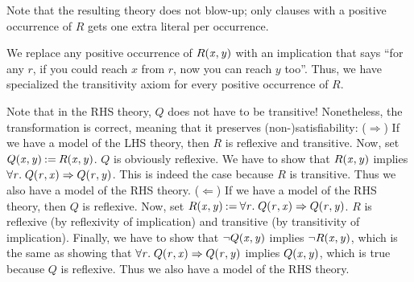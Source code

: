 \documentclass{article}
\newcommand{\Varid}[1]{\mathit{#1}}
\begin{document}
Note that the resulting theory does not blow-up; only clauses with a positive occurrence of \ensuremath{R} gets one extra literal per occurrence.

We replace any positive occurrence of \ensuremath{R\hspace{-0.1cm}\;(\Varid{x},\Varid{y})} with an implication that says ``for any \ensuremath{\Varid{r}}, if you could reach \ensuremath{\Varid{x}} from \ensuremath{\Varid{r}}, now you can reach \ensuremath{\Varid{y}} too''. Thus, we have specialized the transitivity axiom for every positive occurrence of \ensuremath{R}.

Note that in the RHS theory, \ensuremath{Q} does not have to be transitive! Nonetheless, the transformation is correct, meaning that it preserves (non-)satisfiability: ($\Rightarrow$) If we have a model of the LHS theory, then \ensuremath{R} is reflexive and transitive. Now, set \ensuremath{Q\hspace{-0.1cm}\;(\Varid{x},\Varid{y})\mathbin{:=}R\hspace{-0.1cm}\;(\Varid{x},\Varid{y})}. \ensuremath{Q} is obviously reflexive. We have to show that \ensuremath{R\hspace{-0.1cm}\;(\Varid{x},\Varid{y})} implies \ensuremath{\forall{}\hspace{-0.1cm}\;\Varid{r}.\;Q\hspace{-0.1cm}\;(\Varid{r},\Varid{x})\Rightarrow Q\hspace{-0.1cm}\;(\Varid{r},\Varid{y})}. This is indeed the case because \ensuremath{R} is transitive. Thus we also have a model of the RHS theory. ($\Leftarrow$) If we have a model of the RHS theory, then \ensuremath{Q} is reflexive. Now, set \ensuremath{R\hspace{-0.1cm}\;(\Varid{x},\Varid{y})\mathbin{:=}\forall{}\hspace{-0.1cm}\;\Varid{r}.\;Q\hspace{-0.1cm}\;(\Varid{r},\Varid{x})\Rightarrow Q\hspace{-0.1cm}\;(\Varid{r},\Varid{y})}. \ensuremath{R} is reflexive (by reflexivity of implication) and transitive (by transitivity of implication). Finally, we have to show that \ensuremath{\neg{}Q\hspace{-0.1cm}\;(\Varid{x},\Varid{y})} implies \ensuremath{\neg{}R\hspace{-0.1cm}\;(\Varid{x},\Varid{y})}, which is the same as showing that \ensuremath{\forall{}\hspace{-0.1cm}\;\Varid{r}.\;Q\hspace{-0.1cm}\;(\Varid{r},\Varid{x})\Rightarrow Q\hspace{-0.1cm}\;(\Varid{r},\Varid{y})} implies \ensuremath{Q\hspace{-0.1cm}\;(\Varid{x},\Varid{y})}, which is true because \ensuremath{Q} is reflexive. Thus we also have a model of the RHS theory. 
\end{document}

